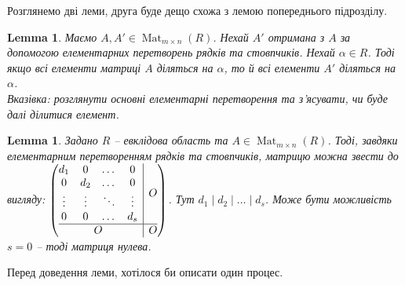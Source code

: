 \documentclass[a4paper, 10pt]{article}
\theoremstyle{theoremdd}
\theoremstyle{theoremdd}
\theoremstyle{theoremdd}
\theoremstyle{theoremdd}
\theoremstyle{theoremdd}
\theoremstyle{theoremdd}
\theoremstyle{theoremdd}
\theoremstyle{theoremdd}
\theoremstyle{theoremdd}
\theoremstyle{theoremdd}
\theoremstyle{theoremdd}
\theoremstyle{theoremdd}
\theoremstyle{theoremdd}
\newtheorem{lemma}[theorem]{Lemma}
\theoremstyle{theoremdd}
\theoremstyle{theoremdd}
\DeclareMathOperator{\Mat}{Mat}
\begin{document}
Розглянемо дві леми, друга буде дещо схожа з лемою попереднього підрозділу.
\begin{lemma} Маємо $A,A' \in \Mat_{m \times n}(R)$. Нехай $A'$ отримана з $A$ за допомогою елементарних перетворень рядків та стовпчиків. Нехай $\alpha \in R$. Тоді якщо всі елементи матриці $A$ діляться на $\alpha$, то й всі елементи $A'$ діляться на $\alpha$.\\
\textit{Вказівка: розглянути основні елементарні перетворення та з'ясувати, чи буде далі ділитися елемент.}
\end{lemma}

\begin{lemma}
Задано $R$ -- евклідова область та $A \in \Mat_{m \times n}(R)$. Тоді, завдяки елементарним перетворенням рядків та стовпчиків, матрицю можна звести до вигляду:
$\left(\begin{array}{@{}c|c@{}}
\begin{matrix}
d_1 & 0 & \dots & 0 \\
0 & d_2 & \dots & 0 \\
\vdots & \vdots & \ddots & \vdots \\
0 & 0 & \dots & d_s
\end{matrix} & O \\
\hline
O & O
\end{array} \right)$. Тут $d_1 \mid d_2 \mid \dots \mid d_s$. Може бути можливість $s = 0$ -- тоді матриця нулева.
\end{lemma}

Перед доведення леми, хотілося би описати один процес.
\end{document}
